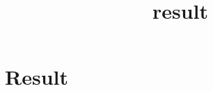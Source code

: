 \documentclass{article}
\title{result}
\begin{document}
\maketitle

\section{Result}
\end{document}
